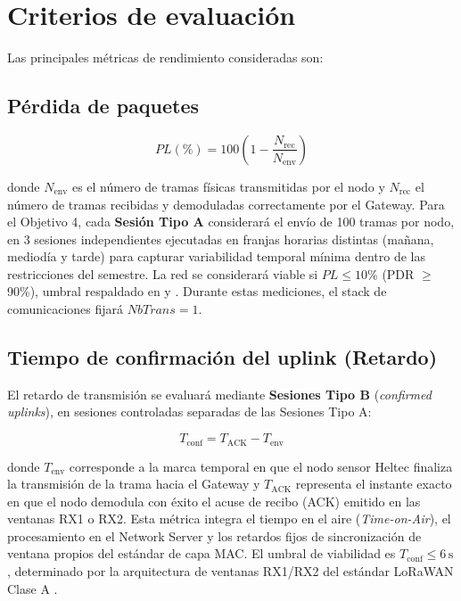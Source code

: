 \documentclass[12pt,oneside,openany,spanish,oldfontcommands]{memoir}
\begin{document}
\section{Criterios de evaluación}

Las principales métricas de rendimiento consideradas son:

\subsection{Pérdida de paquetes}

\begin{equation}
PL(\%) =
100\left(
1-\frac{N_{\mathrm{rec}}}{N_{\mathrm{env}}}
\right)
\label{eq:packetloss}
\end{equation}

donde $N_{\mathrm{env}}$ es el número de tramas físicas transmitidas por el nodo y
$N_{\mathrm{rec}}$ el número de tramas recibidas y demoduladas correctamente por el Gateway.
Para el Objetivo 4, cada \textbf{Sesión Tipo A} considerará el envío de 100 tramas por
nodo, en 3 sesiones independientes ejecutadas en franjas horarias distintas (mañana,
mediodía y tarde) para capturar variabilidad temporal mínima dentro de las restricciones
del semestre. La red se considerará viable si $PL \leq 10\%$ (PDR $\geq$ 90\%), umbral
respaldado en \textcite{kaur2024campus} y \textcite{ahmed2024vegetacion}. Durante estas
mediciones, el stack de comunicaciones fijará $NbTrans = 1$.

\subsection{Tiempo de confirmación del uplink (Retardo)}

El retardo de transmisión se evaluará mediante \textbf{Sesiones Tipo B}
(\textit{confirmed uplinks}), en sesiones controladas separadas de las Sesiones Tipo A:

\begin{equation}
T_{\mathrm{conf}} = T_{\mathrm{ACK}} - T_{\mathrm{env}}
\label{eq:tconf}
\end{equation}

donde $T_{\mathrm{env}}$ corresponde a la marca temporal en que el nodo sensor Heltec
finaliza la transmisión de la trama hacia el Gateway y $T_{\mathrm{ACK}}$ representa el
instante exacto en que el nodo demodula con éxito el acuse de recibo (ACK) emitido en las
ventanas RX1 o RX2. Esta métrica integra el tiempo en el aire (\emph{Time-on-Air}), el
procesamiento en el Network Server y los retardos fijos de sincronización de ventana
propios del estándar de capa MAC. El umbral de viabilidad es $T_{\mathrm{conf}} \leq 6\,\text{s}$,
determinado por la arquitectura de ventanas RX1/RX2 del estándar LoRaWAN Clase A
\parencite{lorawan1_0_4}.
\end{document}
